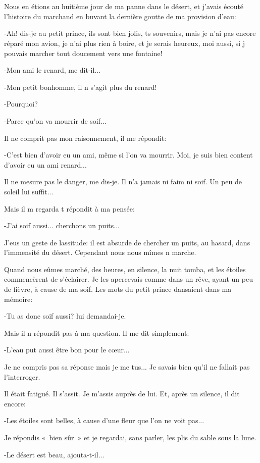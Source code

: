 \documentclass{report}
\newcommand{\parachapter}[2][]{\end{paracol}\chapter[#1]{#2}\begin{paracol}{2}}
\begin{document}
\begin{paracol}{2}
\parachapter{} %
Nous en étions au huitième jour de ma panne dans le désert, et j'avais écouté l'histoire du marchand en buvant la dernière goutte de ma provision d'eau:

-Ah! dis-je au petit prince, ils sont bien jolis, ts souvenirs, mais je n'ai pas encore réparé mon avion, je n'ai plus rien à boire, et je serais heureux, moi aussi, si j pouvais marcher tout doucement vers une fontaine!

-Mon ami le renard, me dit-il...

-Mon petit bonhomme, il n s'agit plus du renard!

-Pourquoi?

-Parce qu'on va mourrir de soif...

Il ne comprit pas mon raisonnement, il me répondit:

-C'est bien d'avoir eu un ami, même si l'on va mourrir. Moi, je suis bien content d'avoir eu un ami renard...

Il ne mesure pas le danger, me dis-je. Il n'a jamais ni faim ni soif. Un peu de soleil lui suffit...

Mais il m regarda t répondit à ma pensée:

-J'ai soif aussi... cherchons un puits...

J'eus un geste de lassitude: il est absurde de chercher un puits, au hasard, dans l'immensité du désert. Cependant nous nous mîmes n marche.

Quand nous eûmes marché, des heures, en silence, la nuit tomba, et les étoiles commencèrent de s'éclairer. Je les apercevais comme dans un rêve, ayant un peu de fièvre, à cause de ma soif. Les mots du petit prince dansaient dans ma mémoire:

-Tu as donc soif aussi? lui demandai-je.

Mais il n répondit pas à ma question. Il me dit simplement:

-L'eau put aussi être bon pour le cœur...

Je ne compris pas sa réponse mais je me tus... Je savais bien qu'il ne fallait pas l'interroger.

Il était fatigué. Il s'assit. Je m'assis auprès de lui. Et, après un silence, il dit encore:

-Les étoiles sont belles, à cause d'une fleur que l'on ne voit pas...

Je répondis «~bien sûr~» et je regardai, sans parler, les plis du sable sous la lune.

-Le désert est beau, ajouta-t-il...


\end{paracol}
\end{document}
